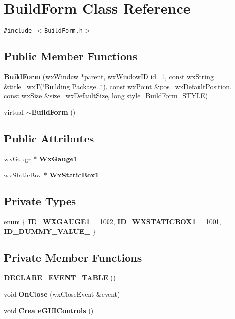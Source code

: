 \section{Build\-Form Class Reference}
\label{class_build_form}
{\tt \#include $<$Build\-Form.h$>$}

\subsection*{Public Member Functions}
\begin{CompactItemize}
\item 
{\bf Build\-Form} (wx\-Window $\ast$parent, wx\-Window\-ID id=1, const wx\-String \&title=wx\-T(\char`\"{}Building Package...\char`\"{}), const wx\-Point \&pos=wx\-Default\-Position, const wx\-Size \&size=wx\-Default\-Size, long style=Build\-Form\_\-STYLE)
\item 
virtual {\bf $\sim$Build\-Form} ()
\end{CompactItemize}
\subsection*{Public Attributes}
\begin{CompactItemize}
\item 
wx\-Gauge $\ast$ {\bf Wx\-Gauge1}
\item 
wx\-Static\-Box $\ast$ {\bf Wx\-Static\-Box1}
\end{CompactItemize}
\subsection*{Private Types}
\begin{CompactItemize}
\item 
enum \{ {\bf ID\_\-WXGAUGE1} =  1002, 
{\bf ID\_\-WXSTATICBOX1} =  1001, 
{\bf ID\_\-DUMMY\_\-VALUE\_\-}
 \}
\end{CompactItemize}
\subsection*{Private Member Functions}
\begin{CompactItemize}
\item 
{\bf DECLARE\_\-EVENT\_\-TABLE} ()
\item 
void {\bf On\-Close} (wx\-Close\-Event \&event)
\item 
void {\bf Create\-GUIControls} ()
\end{CompactItemize}


